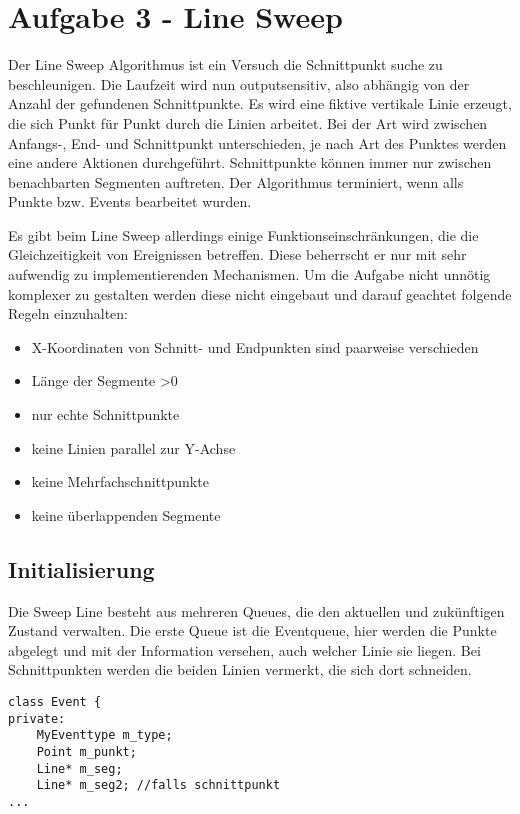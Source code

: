 \section{Aufgabe 3 - Line Sweep}
\label{sec:Aufgabe3}
Der Line Sweep Algorithmus ist ein Versuch die Schnittpunkt suche zu beschleunigen. Die Laufzeit wird nun outputsensitiv, also abhängig von der Anzahl der gefundenen Schnittpunkte. Es wird eine fiktive vertikale Linie erzeugt, die sich Punkt für Punkt durch die Linien arbeitet. Bei der Art wird zwischen Anfangs-, End- und Schnittpunkt unterschieden, je nach Art des Punktes werden eine andere Aktionen durchgeführt. Schnittpunkte können immer nur zwischen benachbarten Segmenten auftreten. Der Algorithmus terminiert, wenn alls Punkte bzw. Events bearbeitet wurden.

Es gibt beim Line Sweep allerdings einige Funktionseinschränkungen, die die Gleichzeitigkeit von Ereignissen betreffen. Diese beherrscht er nur mit sehr aufwendig zu implementierenden Mechanismen. Um die Aufgabe nicht unnötig komplexer zu gestalten werden diese nicht eingebaut und darauf geachtet folgende Regeln einzuhalten:
\begin{itemize}
\item X-Koordinaten von Schnitt- und Endpunkten sind paarweise verschieden
\item Länge der Segmente >0
\item nur echte Schnittpunkte
\item keine Linien parallel zur Y-Achse
\item keine Mehrfachschnittpunkte
\item keine überlappenden Segmente
\end{itemize}



\subsection{Initialisierung}
Die Sweep Line besteht aus mehreren Queues, die den aktuellen und zukünftigen Zustand verwalten. Die erste Queue ist die Eventqueue, hier werden die Punkte abgelegt und mit der Information versehen, auch welcher Linie sie liegen. Bei Schnittpunkten werden die beiden Linien vermerkt, die sich dort schneiden.
\begin{lstlisting}[captionpos=b, caption={Attribute der Klasse Event}, label=A3:Eventpriv]
class Event {
private:
	MyEventtype m_type;
	Point m_punkt;
	Line* m_seg;
	Line* m_seg2; //falls schnittpunkt
...
\end{lstlisting}

